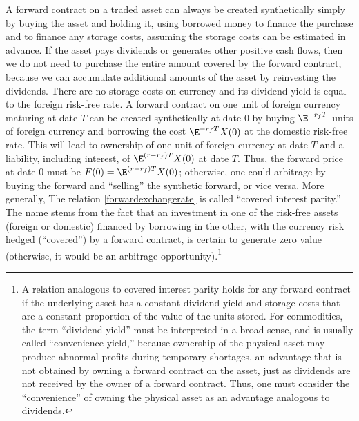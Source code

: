 A forward contract on a traded asset can always be created synthetically simply by buying the asset and holding it, using borrowed money to finance the purchase and to finance any storage costs, assuming the storage costs can be estimated in advance.    If the asset pays dividends or generates other positive cash flows, then we do not need to purchase the entire amount covered by the forward contract, because we can accumulate additional amounts of the asset by reinvesting the dividends.  There are no storage costs on currency and its dividend yield is equal to the foreign risk-free rate.  A forward contract on one unit of foreign currency maturing at date $T$ can be created synthetically at date 0 by buying $\E^{-r_fT}$ units of foreign currency and borrowing the cost $\E^{-r_fT}X(0)$ at the domestic risk-free rate.  This will lead to ownership of one unit of foreign currency at date $T$ and a liability, including interest, of $\E^{(r-r_f)T}X(0)$ at date $T$.  Thus, the forward price at date 0 must be $F(0) = \E^{(r-r_f)T}X(0)$; otherwise, one could arbitrage by buying the forward and ``selling'' the synthetic forward, or vice versa.  More generally, 
The relation \eqref{forwardexchangerate} is called ``covered interest parity.'' The name stems from the fact that an investment in one of the risk-free assets (foreign or domestic) financed by borrowing in the other, with the currency risk hedged (``covered'') by a forward contract, is certain to generate zero value (otherwise, it would be an arbitrage opportunity).\footnote{
A relation analogous to covered interest parity holds for any forward contract if the underlying asset has a constant dividend yield and storage costs that are a constant proportion of the value of the units stored.  For commodities, the term ``dividend yield'' must be interpreted in a broad sense, and is usually called ``convenience yield,''  because ownership of the physical asset may produce abnormal profits during temporary shortages, an advantage that is not obtained by owning a forward contract on the asset, just as dividends are not received by the owner of a forward contract.  Thus, one must consider the ``convenience'' of owning the physical asset as an advantage analogous to dividends.}

